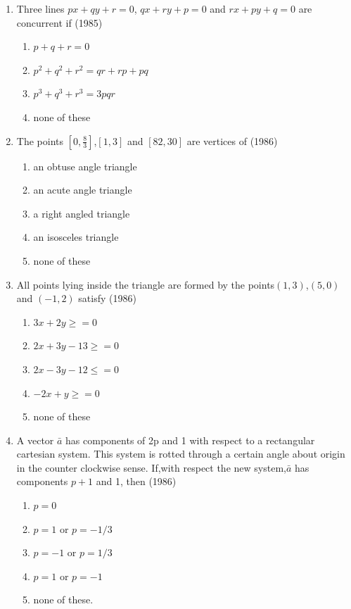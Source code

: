 \documentclass[12pt]{article}
\providecommand{\brak}[1]{\ensuremath{\left(#1\right)}}
\providecommand{\sbrak}[1]{\ensuremath{{}\left[#1\right]}}
\begin{document}
\begin{enumerate}
		\fi
\item Three lines $px+qy+r=0$, $qx+ry+p=0$ and $rx+py+q=0$ are concurrent if  (1985)\\
\begin{enumerate}
\item $p+q+r=0$
\item $p^2+q^2+r^2=qr+rp+pq$
\item $p^3+q^3+r^3=3pqr$
\item none of these
\end{enumerate}
\item The points $\sbrak{0,\frac{8}{3}}$,$\sbrak{1,3}$ and $\sbrak{82,30}$ are vertices of (1986)\\
\begin{enumerate}
\item an obtuse angle triangle
\item an acute angle triangle 
\item a  right angled triangle
\item an isosceles triangle
\item none of these
\end{enumerate}
\item All points lying inside the triangle are formed by the points$\brak{1,3}$,$(5,0)$ and $(-1,2)$ satisfy (1986)\\
\begin{enumerate}
\item $3x+2y\ge=0$
\item $2x+3y-13\ge=0$
\item $2x-3y-12\le=0$
\item $-2x+y\ge=0$
\item none of these
\end{enumerate}
\item A vector $\bar{a}$ has components of 2p and 1 with respect to a rectangular cartesian system. This system is rotted through a certain angle about origin in the counter clockwise sense. If,with respect the new system,$\bar{a}$ has components $p+1$ and 1, then (1986)\\
\begin{enumerate}
\item $p=0$  
\item $p=1$ or  $p=-1/3$  
\item $p=-1$ or $p=1/3$ 
\item $p=1$ or  $p=-1$
\item none of these.
\end{enumerate}

\end{enumerate}
\end{document}
